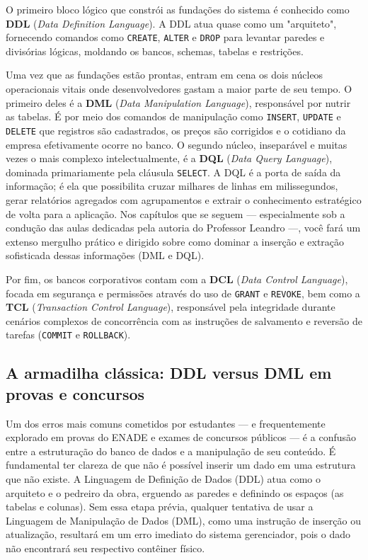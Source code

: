 O primeiro bloco lógico que constrói as fundações do sistema é conhecido como \textbf{DDL} (\textit{Data Definition Language}). A DDL atua quase como um "arquiteto", fornecendo comandos como \texttt{CREATE}, \texttt{ALTER} e \texttt{DROP} para levantar paredes e divisórias lógicas, moldando os bancos, schemas, tabelas e restrições.

Uma vez que as fundações estão prontas, entram em cena os dois núcleos operacionais vitais onde desenvolvedores gastam a maior parte de seu tempo. O primeiro deles é a \textbf{DML} (\textit{Data Manipulation Language}), responsável por nutrir as tabelas. É por meio dos comandos de manipulação como \texttt{INSERT}, \texttt{UPDATE} e \texttt{DELETE} que registros são cadastrados, os preços são corrigidos e o cotidiano da empresa efetivamente ocorre no banco. O segundo núcleo, inseparável e muitas vezes o mais complexo intelectualmente, é a \textbf{DQL} (\textit{Data Query Language}), dominada primariamente pela cláusula \texttt{SELECT}. A DQL é a porta de saída da informação; é ela que possibilita cruzar milhares de linhas em milissegundos, gerar relatórios agregados com agrupamentos e extrair o conhecimento estratégico de volta para a aplicação. Nos capítulos que se seguem — especialmente sob a condução das aulas dedicadas pela autoria do Professor Leandro —, você fará um extenso mergulho prático e dirigido sobre como dominar a inserção e extração sofisticada dessas informações (DML e DQL).

Por fim, os bancos corporativos contam com a \textbf{DCL} (\textit{Data Control Language}), focada em segurança e permissões através do uso de \texttt{GRANT} e \texttt{REVOKE}, bem como a \textbf{TCL} (\textit{Transaction Control Language}), responsável pela integridade durante cenários complexos de concorrência com as instruções de salvamento e reversão de tarefas (\texttt{COMMIT} e \texttt{ROLLBACK}).

\subsection{A armadilha clássica: DDL versus DML em provas e concursos}

Um dos erros mais comuns cometidos por estudantes --- e frequentemente explorado em provas do ENADE e exames de concursos públicos --- é a confusão entre a estruturação do banco de dados e a manipulação de seu conteúdo. É fundamental ter clareza de que não é possível inserir um dado em uma estrutura que não existe. A Linguagem de Definição de Dados (DDL) atua como o arquiteto e o pedreiro da obra, erguendo as paredes e definindo os espaços (as tabelas e colunas). Sem essa etapa prévia, qualquer tentativa de usar a Linguagem de Manipulação de Dados (DML), como uma instrução de inserção ou atualização, resultará em um erro imediato do sistema gerenciador, pois o dado não encontrará seu respectivo contêiner físico.

